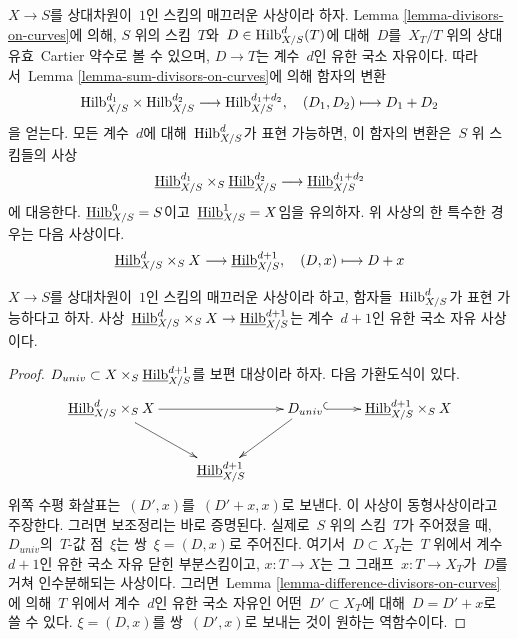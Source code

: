 \noindent
$X \to S$를 상대차원이\  $1$인 스킴의 매끄러운 사상이라 하자.
Lemma \ref{lemma-divisors-on-curves}에 의해, $S$ 위의 스킴\  $T$와\ 
$D \in \mathrm{Hilb}^d_{X/S}(T)$에 대해\  $D$를\  $X_T/T$ 위의 상대 유효\ 
Cartier 약수로 볼 수 있으며, $D \to T$는 계수\  $d$인 유한 국소 자유이다.
따라서\  Lemma \ref{lemma-sum-divisors-on-curves}에 의해 함자의 변환
$$
\mathrm{Hilb}^{d_1}_{X/S} \times \mathrm{Hilb}^{d_2}_{X/S}
\longrightarrow
\mathrm{Hilb}^{d_1 + d_2}_{X/S},\quad
(D_1, D_2) \longmapsto D_1 + D_2
$$
을 얻는다. 모든 계수\  $d$에 대해\  $\mathrm{Hilb}^d_{X/S}$가 표현 가능하면,
이 함자의 변환은\  $S$ 위 스킴들의 사상
$$
\underline{\mathrm{Hilb}}^{d_1}_{X/S}
\times_S
\underline{\mathrm{Hilb}}^{d_2}_{X/S}
\longrightarrow
\underline{\mathrm{Hilb}}^{d_1 + d_2}_{X/S}
$$
에 대응한다. $\underline{\mathrm{Hilb}}^0_{X/S} = S$이고\ 
$\underline{\mathrm{Hilb}}^1_{X/S} = X$임을 유의하자.
위 사상의 한 특수한 경우는 다음 사상이다.
$$
\underline{\mathrm{Hilb}}^d_{X/S} \times_S X
\longrightarrow
\underline{\mathrm{Hilb}}^{d + 1}_{X/S},\quad
(D, x) \longmapsto D + x
$$

\begin{lemma}
\label{lemma-universal-object}
$X \to S$를 상대차원이\  $1$인 스킴의 매끄러운 사상이라 하고, 함자들\ 
$\mathrm{Hilb}^d_{X/S}$가 표현 가능하다고 하자. 사상\ 
$\underline{\mathrm{Hilb}}^d_{X/S} \times_S X \to
\underline{\mathrm{Hilb}}^{d + 1}_{X/S}$는 계수\  $d + 1$인 유한 국소
자유 사상이다.
\end{lemma}

\begin{proof}
$D_{univ} \subset X \times_S \underline{\mathrm{Hilb}}^{d + 1}_{X/S}$를
보편 대상이라 하자. 다음 가환도식이 있다.
$$
\xymatrix{
\underline{\Hilbfunctor}^d_{X/S} \times_S X \ar[rr] \ar[rd] & &
D_{univ} \ar[ld] \ar@{^{(}->}[r] &
\underline{\Hilbfunctor}^{d + 1}_{X/S} \times_S X \\
& \underline{\Hilbfunctor}^{d + 1}_{X/S}
}
$$
위쪽 수평 화살표는\  $(D', x)$를\  $(D' + x, x)$로 보낸다.
이 사상이 동형사상이라고 주장한다. 그러면 보조정리는 바로 증명된다.
실제로\  $S$ 위의 스킴\  $T$가 주어졌을 때, $D_{univ}$의\  $T$-값 점\  $\xi$는
쌍\  $\xi = (D, x)$로 주어진다. 여기서\  $D \subset X_T$는\  $T$ 위에서 계수\ 
$d + 1$인 유한 국소 자유 닫힌 부분스킴이고, $x : T \to X$는 그 그래프\ 
$x : T \to X_T$가\  $D$를 거쳐 인수분해되는 사상이다. 그러면\  Lemma
\ref{lemma-difference-divisors-on-curves}에 의해\  $T$ 위에서 계수\  $d$인
유한 국소 자유인 어떤\  $D' \subset X_T$에 대해\  $D = D' + x$로 쓸 수 있다.
$\xi = (D, x)$를 쌍\  $(D', x)$로 보내는 것이 원하는 역함수이다.
\end{proof}

